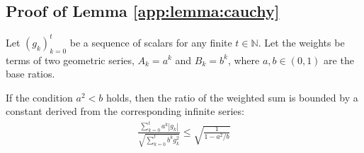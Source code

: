 \documentclass[11pt, letterpaper]{article}
\begin{document}
\subsection{Proof of Lemma \ref{app:lemma:cauchy}}
\begin{lemma}
\label{app:lemma:cauchy}
Let \((g_k)_{k=0}^t\) be a sequence of scalars for any finite \(t \in \mathbb{N}\). Let the weights be terms of two geometric series, \(A_k = a^k\) and \(B_k = b^k\), where \(a, b \in (0, 1)\) are the base ratios.

If the condition \(a^2 < b\) holds, then the ratio of the weighted sum is bounded by a constant derived from the corresponding infinite series:
\begin{align}
    \frac{\sum_{k=0}^{t} a^k |g_k|}{\sqrt{\sum_{k=0}^{t} b^k g_k^2}} \le \sqrt{\frac{1}{1 - a^2/b}} 
\end{align}
\end{lemma}
\end{document}
